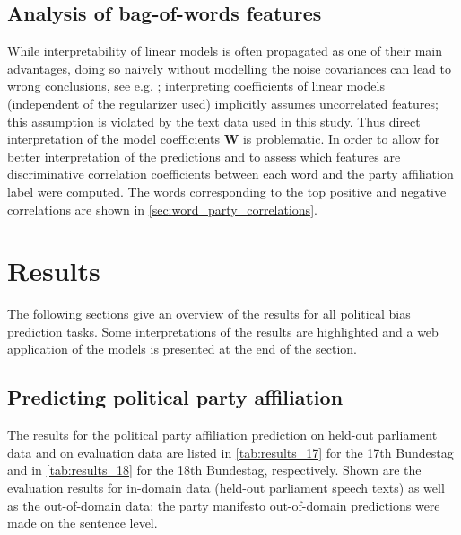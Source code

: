 \documentclass[runningheads,a4paper]{llncs}
\renewcommand{\vec}[1]{\mathbf{#1}}
\begin{document}
\subsection{Analysis of bag-of-words features}\label{sec:correlations_methods}
While interpretability of linear models is often propagated as one of their main advantages, doing so naively without modelling the noise covariances can lead to wrong conclusions, see e.g. \cite{Zien2009, Haufe2013}; interpreting coefficients of linear models (independent of the regularizer used) implicitly assumes uncorrelated features; this assumption is violated by the text data used in this study. Thus direct interpretation of the model coefficients $\vec{W}$ is problematic. In order to allow for better interpretation of the predictions and to assess which features are discriminative correlation coefficients between each word and the party affiliation label were computed. The words corresponding to the top positive and negative correlations are shown in \autoref{sec:word_party_correlations}.

\section{Results}\label{sec:results}

The following sections give an overview of the results for all political bias prediction tasks. Some interpretations of the results are highlighted and a web application of the models is presented at the end of the section.

\subsection{Predicting political party affiliation}
The results for the political party affiliation prediction on held-out parliament data and on evaluation data are listed in \autoref{tab:results_17} for the 17th Bundestag and in \autoref{tab:results_18} for the 18th Bundestag, respectively. 
Shown are the evaluation results for in-domain data (held-out parliament speech texts) as well as the out-of-domain data; the party manifesto out-of-domain predictions were made on the sentence level. 
\end{document}

